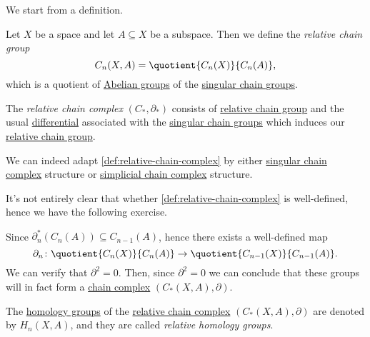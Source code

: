 We start from a definition.
\begin{definition}\label{def:relative-chain-group}
	Let \(X\) be a space and let \(A \subseteq X\) be a subspace. Then we define the \emph{relative chain group}
	\[
		C_n(X, A) = \quotient{C_n(X)}{C_n(A)},
	\]
	which is a quotient of \hyperref[def:Abelian-group]{Abelian groups} of the \hyperref[def:singular-chain-group]{singular chain groups}.
\end{definition}
\begin{definition}\label{def:relative-chain-complex}
	The \emph{relative chain complex} \((C_\ast, \partial_\ast )\) consists of \hyperref[def:relative-chain-group]{relative chain group}
	and the usual \hyperref[def:differential]{differential} associated with the \hyperref[def:singular-chain-group]{singular chain groups} which
	induces our \hyperref[def:relative-chain-group]{relative chain group}.
\end{definition}
\begin{remark}
	We can indeed adapt \autoref{def:relative-chain-complex} by either \hyperref[def:singular-chain-complex]{singular chain complex}
	structure or \hyperref[def:simplicial-complex]{simplicial chain complex} structure.
\end{remark}

It's not entirely clear that whether \autoref{def:relative-chain-complex} is well-defined, hence we have the following exercise.
\begin{exercise}
	Since \(\partial^\ast_n(C_{n} (A))\subseteq C_{n-1}(A) \), hence there exists a well-defined map
	\[
		\partial_n\colon \quotient{C_{n} (X)}{C_{n} (A)} \to \quotient{C_{n-1} (X)}{C_{n-1}(A)}.
	\]
	We can verify that \(\partial^{2} =0\). Then, since \(\partial^2 = 0\) we can conclude that these groups will in fact form a
	\hyperref[def:chain-complex]{chain complex} \((C_\ast(X, A), \partial)\).
\end{exercise}

\begin{definition}\label{def:relative-homology-group}
	The \hyperref[def:homology-group]{homology groups} of the \hyperref[def:relative-chain-complex]{relative chain complex} \((C_\ast(X, A), \partial)\) are denoted
	by \(H_n(X, A)\), and they are called \emph{relative homology groups}.
\end{definition}

